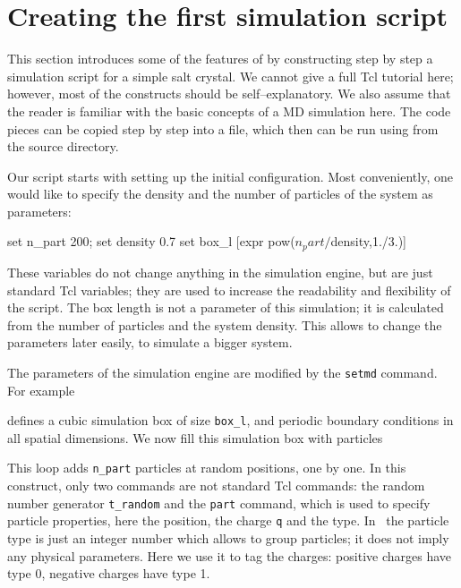 \section{Creating the first simulation script}

This section introduces some of the features of \es by constructing
step by step a simulation script for a simple salt crystal.  We cannot
give a full Tcl tutorial here; however, most of the constructs should
be self--explanatory. We also assume that the reader is familiar with
the basic concepts of a MD simulation here. The code pieces can be
copied step by step into a file, which then can be run using
 from the \es source directory.

Our script starts with setting up the initial configuration.  Most
conveniently, one would like to specify the density and the number of
particles of the system as parameters:
\begin{tclcode}
set n_part 200; set density 0.7
set box_l [expr pow($n_part/$density,1./3.)]
\end{tclcode}
These variables do not change anything in the simulation engine, but
are just standard Tcl variables; they are used to increase the
readability and flexibility of the script. The box length is not a
parameter of this simulation; it is calculated from the number of
particles and the system density. This allows to change the parameters
later easily, \eg to simulate a bigger system.

The parameters of the simulation engine are modified by the
\verb|setmd| command. For example
defines a cubic simulation box of size \verb|box_l|, and periodic
boundary conditions in all spatial dimensions. We now fill this
simulation box with particles
This loop adds \verb|n_part| particles at random positions, one by
one.  In this construct, only two commands are not standard Tcl
commands: the random number generator \verb|t_random| and the
\verb|part| command, which is used to specify particle properties,
here the position, the charge \verb|q| and the type. In \es\ the
particle type is just an integer number which allows to group
particles; it does not imply any physical parameters. Here we use it
to tag the charges: positive charges have type 0, negative charges
have type 1.

